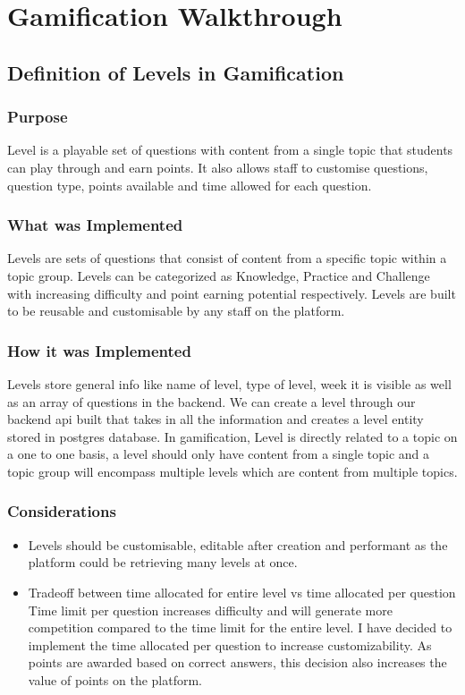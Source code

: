 
\section{Gamification Walkthrough}

\subsection{Definition of Levels in Gamification }

\subsubsection{Purpose}
Level is a playable set of questions with content from a single topic that students can play through and earn points. It also allows staff to customise questions, question type, points available and time allowed for each question.

\subsubsection{What was Implemented}
Levels are sets of questions that consist of content from a specific topic within a topic group. Levels can be categorized as Knowledge, Practice and Challenge with increasing difficulty and point earning potential respectively. Levels are built to be reusable and customisable by any staff on the platform.

\subsubsection{How it was Implemented}
Levels store general info like name of level, type of level, week it is visible as well as an array of questions in the backend. We can create a level through our backend api built that takes in all the information and creates a level entity stored in postgres database. In gamification, Level is directly related to a topic on a one to one basis, a level should only have content from a single topic and a topic group will encompass multiple levels which are content from multiple topics.

\subsubsection{Considerations}
\begin{itemize}
    \item Levels should be customisable, editable after creation and performant as the platform could be retrieving many levels at once.
    \item Tradeoff between time allocated for entire level vs time allocated per question
Time limit per question increases difficulty and will generate more competition compared to the time limit for the entire level. I have decided to implement the time allocated per question to increase customizability. As points are awarded based on correct answers, this decision also increases the value of points on the platform.
\end{itemize}

